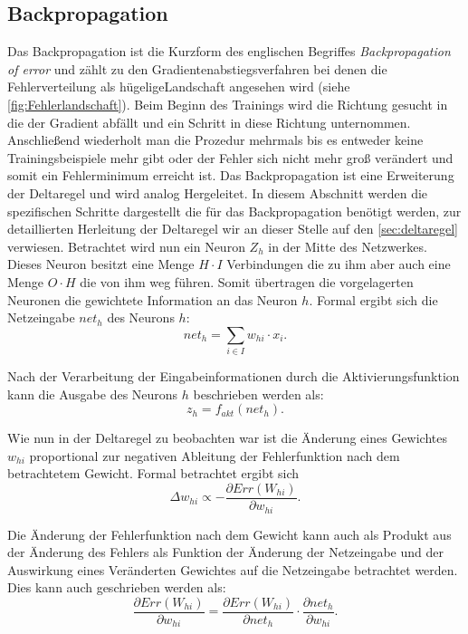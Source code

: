 \subsection{Backpropagation}\label{sec:Backpropagation}
Das Backpropagation ist die Kurzform des englischen Begriffes \textit{Backpropagation of error} und zählt zu den Gradientenabstiegsverfahren bei denen die Fehlerverteilung als \glqq hügelige\grqq Landschaft angesehen wird (siehe \autoref{fig:Fehlerlandschaft}). Beim Beginn des Trainings wird die Richtung gesucht in die der Gradient abfällt und ein Schritt in diese Richtung unternommen. Anschließend wiederholt man die Prozedur mehrmals bis es entweder keine Trainingsbeispiele mehr gibt oder der Fehler sich nicht mehr groß verändert und somit ein Fehlerminimum erreicht ist. Das Backpropagation ist eine Erweiterung der Deltaregel und wird analog Hergeleitet. In diesem Abschnitt werden die spezifischen Schritte dargestellt die für das Backpropagation benötigt werden, zur detaillierten Herleitung der Deltaregel wir an dieser Stelle auf den \autoref{sec:deltaregel} verwiesen.
Betrachtet wird nun ein Neuron $Z_h$ in der Mitte des Netzwerkes. Dieses Neuron besitzt eine Menge $H \cdot I$ Verbindungen die zu ihm aber auch eine Menge $O \cdot H$ die von ihm weg führen. Somit übertragen die vorgelagerten Neuronen die gewichtete Information an das Neuron $h$. Formal ergibt sich die Netzeingabe $net_{h}$ des Neurons $h$:
\begin{equation}
net_{h} = \sum_{i \in I} w_{hi} \cdot x_{i} .
\label{gl:neth}
\end{equation}

Nach der Verarbeitung der Eingabeinformationen durch die Aktivierungsfunktion kann die Ausgabe des Neurons $h$ beschrieben werden als:
\begin{equation}
z_{h}= f_{akt}(net_{h}) .
\label{gl:aktiv}
\end{equation}

Wie nun in der Deltaregel zu beobachten war ist die Änderung eines Gewichtes $w_{hi}$ proportional zur negativen Ableitung der Fehlerfunktion nach dem betrachtetem Gewicht. Formal betrachtet ergibt sich
\begin{equation*}
\Delta w_{hi} \propto -  \frac{\partial Err(W_{hi})}{\partial w_{hi}}.
\end{equation*}

Die Änderung der Fehlerfunktion nach dem Gewicht kann auch als Produkt aus der Änderung des Fehlers als Funktion der Änderung der Netzeingabe und der Auswirkung eines Veränderten Gewichtes auf die Netzeingabe betrachtet werden. Dies kann auch geschrieben werden als:
\begin{equation}
\frac{\partial Err(W_{hi})}{\partial w_{hi}} = \frac{\partial Err(W_{hi})}{\partial net_{h}} \cdot \frac{\partial net_{h}}{\partial w_{hi}}.
\label{gl:zerlket2}
\end{equation}

